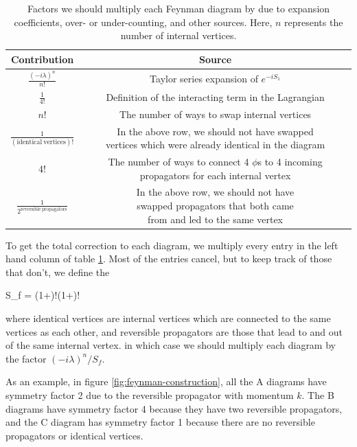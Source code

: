 \begin{table}
  \centering
  \bgroup
  \small
  \def\arraystretch{3}
  \begin{tabular}{c|c}
    \hline \hline
    Contribution & Source\\ \hline
    $\displaystyle \frac{(-i\lambda)^n}{n!}$ & Taylor series expansion of $e^{-iS_1}$\\
    $\displaystyle \frac{1}{4!}$ & Definition of the interacting term in the Lagrangian\\
    $n!$ & The number of ways to swap internal vertices\\
    $\displaystyle \frac{1}{(\mathrm{identical\ vertices})!}$ & \makecell{In the above row, we should not have swapped \\vertices which were already identical in the diagram}\\
    $4!$ & \makecell{The number of ways to connect 4 $\phi$s to 4 incoming\\ propagators for each internal vertex}\\
    $\displaystyle \frac{1}{2^{\mathrm{reversible\ propagators}}}$ & \makecell{In the above row, we should not have \\swapped propagators that both came \\from and led to the same vertex}\\
    \hline \hline
  \end{tabular}
  \caption{Factors we should multiply each Feynman diagram by due to expansion coefficients, over- or under-counting, and other sources. Here, $n$ represents the number of internal vertices.}
  \egroup
  \label{tab:symmetry-factor}
\end{table}

To get the total correction to each diagram, we multiply every entry in the left hand column of table \ref{tab:symmetry-factor}. Most of the entries cancel, but to keep track of those that don't, we define the 
\begin{e}
  S_f = (1+)!(1+)!
  \label{eqn:symmetry-factor}
\end{e}
where identical vertices are internal vertices which are connected to the same vertices as each other, and reversible propagators are those that lead to and out of the same internal vertex.
in which case we should multiply each diagram by the factor $(-i\lambda)^n / S_f$.

As an example, in figure \ref{fig:feynman-construction}, all the A diagrams have symmetry factor 2 due to the reversible propagator with momentum $k$. The B diagrams have symmetry factor 4 because they have two reversible propagators, and the C diagram has symmetry factor 1 because there are no reversible propagators or identical vertices.

